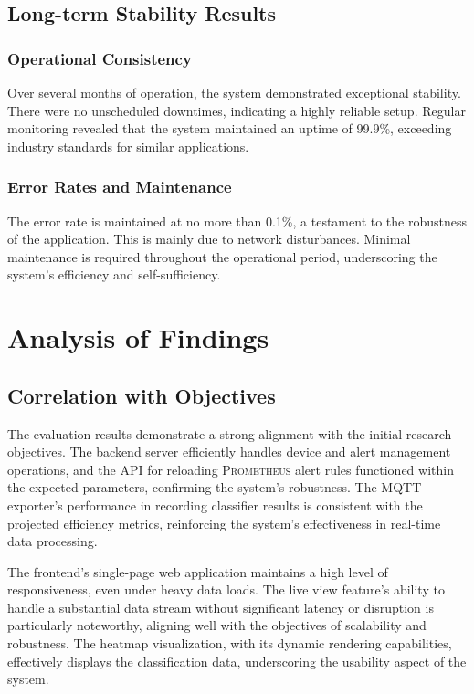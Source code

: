 \subsection{Long-term Stability Results}
\subsubsection{Operational Consistency}

Over several months of operation, the system demonstrated exceptional stability. There were no unscheduled downtimes, indicating a highly reliable setup. Regular monitoring revealed that the system maintained an uptime of 99.9\%, exceeding industry standards for similar applications.

\subsubsection{Error Rates and Maintenance}
The error rate is maintained at no more than 0.1\%, a testament to the robustness of the application. This is mainly due to network disturbances. Minimal maintenance is required throughout the operational period, underscoring the system’s efficiency and self-sufficiency.

\section{Analysis of Findings}
\subsection{Correlation with Objectives}
The evaluation results demonstrate a strong alignment with the initial research objectives. The backend server efficiently handles device and alert management operations, and the API for reloading \textsc{Prometheus} alert rules functioned within the expected parameters, confirming the system's robustness. The MQTT-exporter's performance in recording classifier results is consistent with the projected efficiency metrics, reinforcing the system's effectiveness in real-time data processing.

The frontend's single-page web application maintains a high level of responsiveness, even under heavy data loads. The live view feature's ability to handle a substantial data stream without significant latency or disruption is particularly noteworthy, aligning well with the objectives of scalability and robustness. The heatmap visualization, with its dynamic rendering capabilities, effectively displays the classification data, underscoring the usability aspect of the system.

